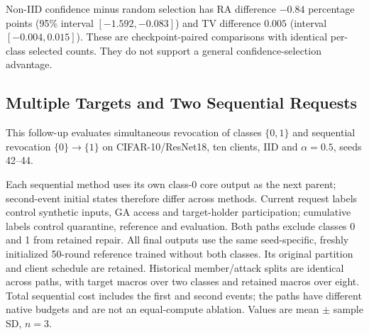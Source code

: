 \documentclass[software,article,submit,moreauthors]{Definitions/mdpi}
\begin{document}
Non-IID confidence minus random selection has RA difference $-0.84$ percentage points (95\% interval $[-1.592, -0.083]$) and TV difference $0.005$ (interval $[-0.004, 0.015]$). These are checkpoint-paired comparisons with identical per-class selected counts. They do not support a general confidence-selection advantage.

\subsection{Multiple Targets and Two Sequential Requests}

\label{sec:sequence}

This follow-up evaluates simultaneous revocation of classes $\{0,1\}$ and sequential revocation $\{0\}\rightarrow\{1\}$ on CIFAR-10/ResNet18, ten clients, IID and $\alpha=0.5$, seeds 42--44.

Each sequential method uses its own class-0 core output as the next parent; second-event initial states therefore differ across methods. Current request labels control synthetic inputs, GA access and target-holder participation; cumulative labels control quarantine, reference and evaluation. Both paths exclude classes 0 and 1 from retained repair. All final outputs use the same seed-specific, freshly initialized 50-round reference trained without both classes. Its original partition and client schedule are retained. Historical member/attack splits are identical across paths, with target macros over two classes and retained macros over eight. Total sequential cost includes the first and second events; the paths have different native budgets and are not an equal-compute ablation. Values are mean $\pm$ sample SD, $n=3$.
\end{document}

